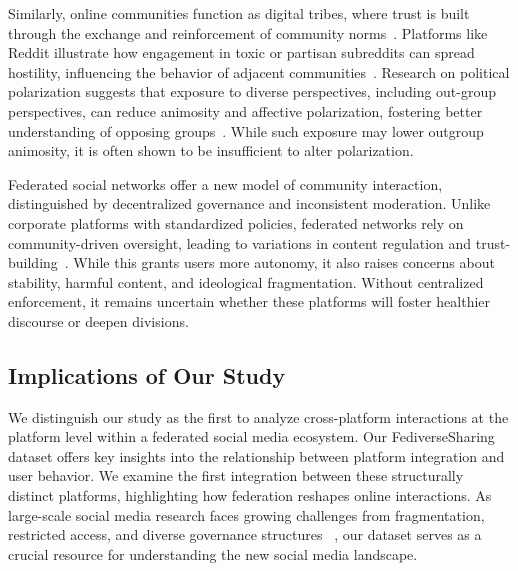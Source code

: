 Similarly, online communities function as digital tribes, where trust is built through the exchange and reinforcement of community norms~\cite{pettigrew2013does, demoulin2013intergroup}. Platforms like Reddit illustrate how engagement in toxic or partisan subreddits can spread hostility, influencing the behavior of adjacent communities~\cite{russo2024stranger, kumar2018community}. Research on political polarization suggests that exposure to diverse perspectives, including out-group perspectives, can reduce animosity and affective polarization, fostering better understanding of opposing groups~\cite{cohen2010competitive}. While such exposure may lower outgroup animosity, it is often shown to be insufficient to alter polarization.

Federated social networks offer a new model of community interaction, distinguished by decentralized governance and inconsistent moderation. Unlike corporate platforms with standardized policies, federated networks rely on community-driven oversight, leading to variations in content regulation and trust-building~\cite{schreieck2024typology}. While this grants users more autonomy, it also raises concerns about stability, harmful content, and ideological fragmentation. Without centralized enforcement, it remains uncertain whether these platforms will foster healthier discourse or deepen divisions.

\subsection{Implications of Our Study}
We distinguish our study as the first to analyze cross-platform interactions at the platform level within a federated social media ecosystem. Our FediverseSharing dataset offers key insights into the relationship between platform integration and user behavior. We examine the first integration between these structurally distinct platforms, highlighting how federation reshapes online interactions. As large-scale social media research faces growing challenges from fragmentation, restricted access, and diverse governance structures ~\cite{ng2024smi}, our dataset serves as a crucial resource for understanding the new social media landscape.









